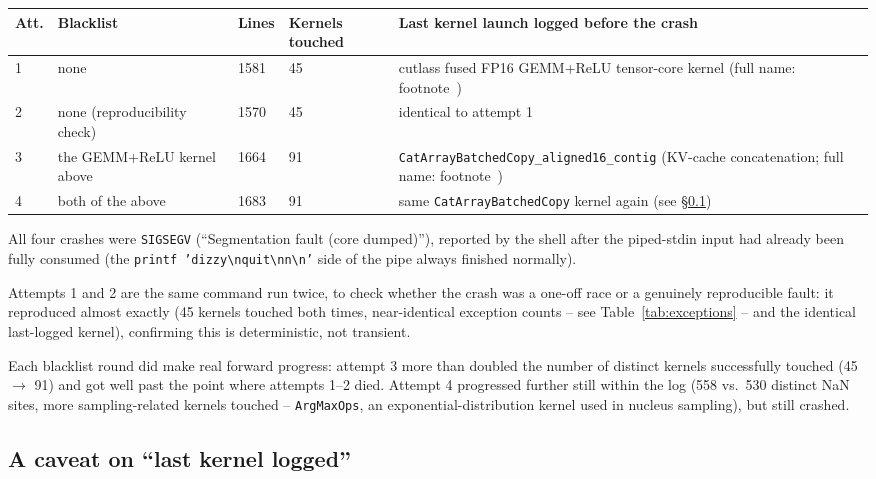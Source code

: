\documentclass[11pt]{article}
\begin{document}
\begin{longtable}{p{1.4cm}p{2.9cm}p{1.3cm}p{2.2cm}p{4.6cm}}
\toprule
\textbf{Att.} & \textbf{Blacklist} & \textbf{Lines} & \textbf{Kernels touched} & \textbf{Last kernel launch logged before the crash} \\
\midrule
\endhead
1 &
  none &
  1581 &
  45 &
  cutlass fused FP16 GEMM+ReLU tensor-core kernel (full name: footnote~\footnotemark[1]) \\
2 &
  none (reproducibility check) &
  1570 &
  45 &
  identical to attempt 1 \\
3 &
  the GEMM+ReLU kernel above &
  1664 &
  91 &
  \texttt{CatArrayBatchedCopy\_\allowbreak aligned16\_\allowbreak contig} (KV-cache concatenation; full name: footnote~\footnotemark[2]) \\
4 &
  both of the above &
  1683 &
  91 &
  same \texttt{CatArrayBatchedCopy} kernel again (see \S\ref{sec:caveat}) \\
\bottomrule
\end{longtable}

All four crashes were \texttt{SIGSEGV} (``Segmentation fault (core
dumped)''), reported by the shell after the piped-stdin input had already
been fully consumed (the \texttt{printf 'dizzy\textbackslash nquit\textbackslash nn\textbackslash n'} side of the
pipe always finished normally).

Attempts 1 and 2 are the same command run twice, to check whether the
crash was a one-off race or a genuinely reproducible fault: it reproduced
almost exactly (45 kernels touched both times, near-identical exception
counts -- see Table~\ref{tab:exceptions} -- and the identical last-logged
kernel), confirming this is deterministic, not transient.

Each blacklist round did make real forward progress: attempt 3 more than
doubled the number of distinct kernels successfully touched (45
$\rightarrow$ 91) and got well past the point where attempts 1--2 died.
Attempt 4 progressed further still within the log (558 vs.\ 530 distinct
NaN sites, more sampling-related kernels touched -- \texttt{ArgMaxOps},
an exponential-distribution kernel used in nucleus sampling), but still
crashed.

\subsection{A caveat on ``last kernel logged''}
\label{sec:caveat}
\end{document}
